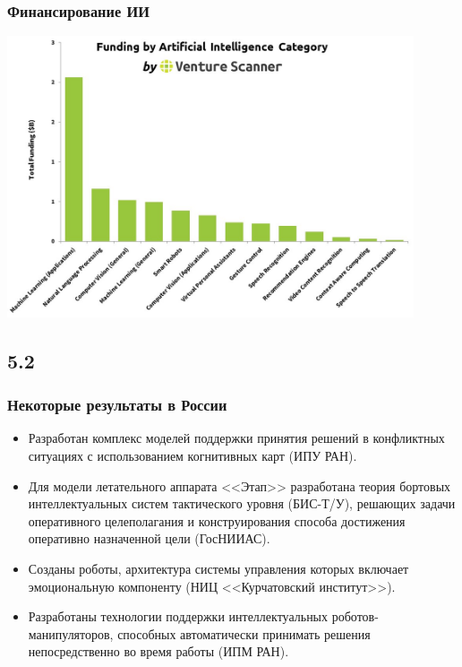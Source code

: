 \documentclass[default]{beamer}
\begin{document}
	\begin{frame}
		\frametitle{Финансирование ИИ}
		\centering
		\includegraphics[width=0.9\textwidth]{ai_fund.jpg}
	\end{frame}

	\subsection{5.2}
	\begin{frame}
		\frametitle{Некоторые результаты в России}

		\begin{itemize}
			\item Разработан комплекс моделей поддержки принятия решений в конфликтных ситуациях с использованием когнитивных карт (ИПУ РАН). 
			\item Для модели летательного аппарата <<Этап>>	разработана теория бортовых 	интеллектуальных систем тактического уровня (БИС-Т/У), решающих задачи оперативного целеполагания и конструирования способа достижения оперативно назначенной цели (ГосНИИАС).
			\item Созданы роботы, архитектура системы управления которых включает эмоциональную компоненту (НИЦ <<Курчатовский институт>>). 
			\item Разработаны технологии поддержки интеллектуальных роботов-манипуляторов, способных автоматически принимать решения непосредственно во время работы (ИПМ РАН).
		\end{itemize}
	\end{frame}
\end{document}
